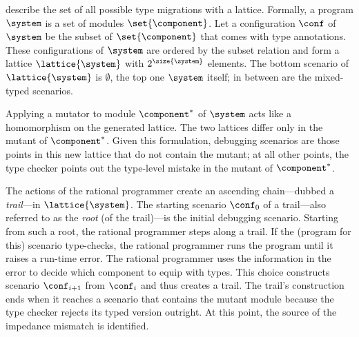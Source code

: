 
\citet{tfgnvf-popl-2016} describe the set of all possible type migrations with a
lattice. Formally, a program $\system$ is a set of modules $\set{\component}$.
Let a configuration $\conf$ of $\system$ be the subset of $\set{\component}$
that comes with type annotations. These configurations of $\system$ are ordered
by the subset relation and form a lattice $\lattice{\system}$ with
$2^{\size{\system}}$ elements. The bottom scenario of $\lattice{\system}$ is
$\emptyset$, the top one $\system$ itself; in between are the mixed-typed
scenarios.

Applying a mutator to module $\component^*$ of $\system$ acts like a homomorphism
on the generated lattice. The two lattices differ only in the mutant of
$\component^*$. Given this formulation, debugging scenarios are those points in
this new lattice that do not contain the mutant; at all other points, the type
checker points out the type-level mistake in the mutant of $\component^*$.

The actions of the rational programmer create an ascending chain---dubbed a
\emph{trail}---in $\lattice{\system}$.  The starting scenario $\conf_0$ of a
trail---also referred to as the \emph{root} (of the trail)---is the initial
debugging scenario.  Starting from such a root, the rational
programmer steps along a trail. If the (program for this) scenario type-checks,
the rational programmer runs the program until it raises a run-time error.  The rational programmer
uses the information in the error to decide which component to equip with
types. This choice constructs scenario $\conf_{i+1}$ from $\conf_{i}$ and thus
creates a trail. The trail's construction ends when it reaches a scenario that
contains the mutant module because the type checker rejects its typed version
outright.  At this point, the source of the impedance mismatch is identified.
